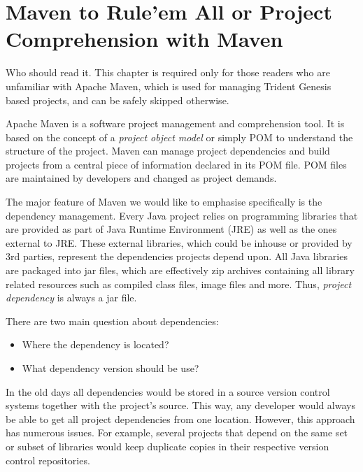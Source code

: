 \chapter{Maven to Rule'em All or Project Comprehension with Maven}\label{ch00:01}


  \begin{notebox}{Who should read it.}{\label{mb:skip}}
    This chapter is required only for those readers who are unfamiliar with Apache Maven, which is used for managing Trident Genesis based projects, and can be safely skipped otherwise.
  \end{notebox}
  
  Apache Maven is a software project management and comprehension tool. 
  It is based on the concept of a \emph{project object model} or simply POM to understand the structure of the project. 
  Maven can manage project dependencies and build projects from a central piece of information declared in its POM file.
  POM files are maintained by developers and changed as project demands.

  The major feature of Maven we would like to emphasise specifically is the dependency management.
  Every Java project relies on programming libraries that are provided as part of Java Runtime Environment (JRE) as well as the ones external to JRE.
  These external libraries, which could be inhouse or provided by 3rd parties, represent the dependencies projects depend upon.
  All Java libraries are packaged into jar files, which are effectively zip archives containing all library related resources such as compiled class files, image files and more.
  Thus, \emph{project dependency} is always a jar file.

  There are two main question about dependencies: 
  \begin{itemize}
    \item Where the dependency is located?
    \item What dependency version should be use?
  \end{itemize}

  In the old days all dependencies would be stored in a source version control systems together with the project's source.
  This way, any developer would always be able to get all project dependencies from one location.
  However, this approach has numerous issues.
  For example, several projects that depend on the same set or subset of libraries would keep duplicate copies in their respective version control repositories.

